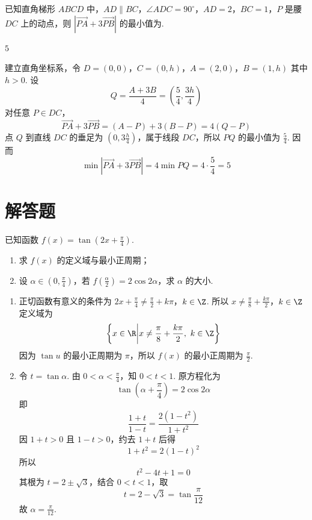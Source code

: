 \begin{problem}
已知直角梯形 \(ABCD\) 中，\(AD \parallel BC\)，\(\angle ADC = 90^{\circ}\)，\(AD = 2\)，\(BC = 1\)，\(P\) 是腰 \(DC\) 上的动点，则 \(\left|\overrightarrow{PA} + 3\overrightarrow{PB}\right|\) 的最小值为\fillinblank{}.
\begin{answer}
\(5\)
\end{answer}

\begin{solution}
建立直角坐标系，令
\(D=(0,0)\)，\(C=(0,h)\)，\(A=(2,0)\)，\(B=(1,h)\)
其中 \(h>0\). 设
\[
Q=\frac{A+3B}{4}
=\left(\frac54,\frac{3h}{4}\right)
\]
对任意 \(P\in DC\)，
\[
\overrightarrow{PA}+3\overrightarrow{PB}
=(A-P)+3(B-P)
=4(Q-P)
\]
点 \(Q\) 到直线 \(DC\) 的垂足为 \((0,3\frac{h}{4})\)，属于线段 \(DC\)，所以 \(PQ\) 的最小值为 \(\frac{5}{4}\). 因而
\[
\min\left|\overrightarrow{PA}+3\overrightarrow{PB}\right|
=4\min PQ=4\cdot\frac54=5
\]
\end{solution}
\end{problem}

\section{解答题}

\begin{problem}
已知函数 \( f(x) = \tan \left(2x + \frac{\pi}{4}\right) \).
\begin{enumerate}
\item 求 \( f(x) \) 的定义域与最小正周期；
\item 设 \(\alpha \in (0, \frac{\pi}{4})\)，若 \(f\left(\frac{\alpha}{2}\right) = 2\cos 2\alpha\)，求 \(\alpha\) 的大小.
\end{enumerate}
\begin{solution}
\begin{enumerate}
\item 正切函数有意义的条件为
\(2x+\frac{\pi}{4}\ne\frac{\pi}{2}+k\pi\)，\(k\in\Z\).
所以
\(x\ne\frac{\pi}{8}+\frac{k\pi}{2}\)，\(k\in\Z\)
定义域为
\[
\left\{x\in\R\middle|x\ne\frac{\pi}{8}+\frac{k\pi}{2},\ k\in\Z\right\}
\]
因为 \(\tan u\) 的最小正周期为 \(\pi\)，所以 \(f(x)\) 的最小正周期为 \(\frac{\pi}{2}\).

\item 令 \(t=\tan\alpha\). 由 \(0<\alpha<\frac{\pi}{4}\)，知 \(0<t<1\). 原方程化为
\[
\tan\left(\alpha+\frac{\pi}{4}\right)=2\cos2\alpha
\]
即
\[
\frac{1+t}{1-t}=\frac{2(1-t^2)}{1+t^2}
\]
因 \(1+t>0\) 且 \(1-t>0\)，约去 \(1+t\) 后得
\[
1+t^2=2(1-t)^2
\]
所以
\[
t^2-4t+1=0
\]
其根为 \(t=2\pm\sqrt3\)，结合 \(0<t<1\)，取
\[
t=2-\sqrt3=\tan\frac{\pi}{12}
\]
故 \(\alpha=\frac{\pi}{12}\).
\end{enumerate}
\end{solution}
\end{problem}

